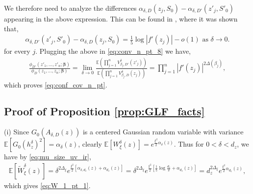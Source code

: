\documentclass[a4paper, 11pt, reqno]{amsart}
\theoremstyle{definition} \newtheorem{defn}{Definition}[section]
\theoremstyle{remark} \newtheorem{rem}[defn]{Remark}
\theoremstyle{remark} \newtheorem*{rem*}{Remark}
\theoremstyle{plain} \newtheorem{thm}[defn]{Theorem}
\theoremstyle{plain} \newtheorem{lem}[defn]{Lemma}
\theoremstyle{plain} \newtheorem{prop}[defn]{Proposition}
\theoremstyle{plain} \newtheorem{cor}[defn]{Corollary}
\theoremstyle{remark} \newtheorem{exm}[defn]{\textbf{Example}}
\theoremstyle{remark} \newtheorem{exms}[defn]{\textbf{Examples}}
\theoremstyle{remark} \newtheorem*{bl}{}
\numberwithin{equation}{section} %
\newcommand{\E}{\mathbb{E}}
\begin{document}
       We therefore need to analyze the differences $\alpha_{\delta, D}(z_j, S_0) - \alpha_{\delta, D'}(z'_j, S'_0)$ appearing in the above expression. This can be found in \cite[p. 498]{cgk16}, where it was shown that,
       \begin{align}
           \alpha_{\delta, D'}(z'_j, S'_0)-\alpha_{\delta, D}(z_j, S_0) = \frac{1}{5} \log|f'(z_j)| - o(1) \text{ as } \delta \to 0.
       \end{align}
       for every $j$. Plugging the above in \eqref{eq:conv_n_pt_8} we have,
       \begin{align}
           \frac{\phi_{D'}(z'_1, \ldots, z'_n; {\bm \beta})}{\phi_{D}(z_1, \ldots, z_n; {\bm \beta})} = \lim_{\delta \to 0} \frac{\E\left(\prod_{j=1}^n V^{\delta}_{\beta_j , D'}(z'_j)\right) }{\E\left(\prod_{j=1}^n V^{\delta}_{\beta_j , D}(z_j)\right) } =\prod_{j=1}^n |f'(z_j)|^{2\Delta(\beta_j)}, 
       \end{align}
       which proves \eqref{eq:conf_cov_n_pt}.

    \subsection{Proof of Proposition \ref{prop:GLF_facts}} \label{app:proof_prop_GLF_facts}
    (i) Since $G_0(A_{\delta, D}(z))$ is a centered Gaussian random variable with variance $\E[G_0(h^{\delta}_z)^2] = \alpha_{\delta}(z)$, clearly $\E[W^{\delta}_{\xi} (z)] = e^{\frac{\xi^2}{2}\alpha_{\delta}(z)}$. Thus for $0<\delta < d_z$, we have by \eqref{eq:mu_size_uv_ir},
		\begin{align}
			\E[\tilde{W}^{\delta}_{\xi}(z)] 
			=  \delta^{2\Delta_{\xi}} e^{\frac{\xi^2}{2} [\alpha_{\delta, d_z }(z) + \alpha_{d_z }(z)]}
			=  \delta^{2\Delta_{\xi}} e^{\frac{\xi^2}{2} \left[\frac{1}{5} \log\frac{d_z}{\delta} + \alpha_{d_z }(z)\right]}
		      =  d_z^{2\Delta_{\xi} } e^{\frac{\xi^2}{2} \alpha_{d_z}(z)},
		\end{align}
		which gives \eqref{eq:W_1_pt_1}.
\end{document}
